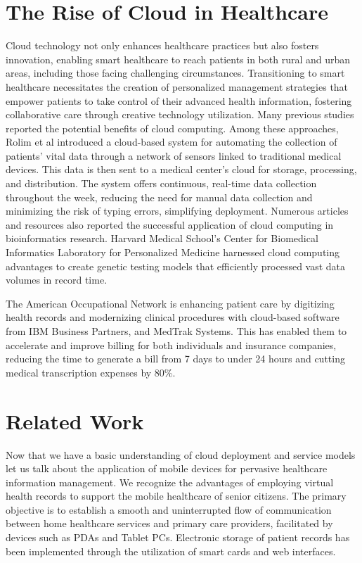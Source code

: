 \documentclass{article}
\begin{document}
\section{The Rise of Cloud in Healthcare} Cloud technology not only enhances healthcare practices but also fosters innovation, enabling smart healthcare to reach patients in both rural and urban areas, including those facing challenging circumstances.
Transitioning to smart healthcare necessitates the creation of personalized management strategies that empower patients to take control of their advanced health information, fostering collaborative care through creative technology utilization. Many previous studies reported the potential benefits of cloud computing.
Among these approaches, Rolim et al introduced a cloud-based system for automating the collection of patients' vital data through a network of sensors linked to traditional medical devices. This data is then sent to a medical center's cloud for storage, processing, and distribution. The system offers continuous, real-time data collection throughout the week, reducing the need for manual data collection and minimizing the risk of typing errors, simplifying deployment. Numerous articles and resources also reported the successful application of cloud computing in bioinformatics research. Harvard Medical School's Center for Biomedical Informatics Laboratory for Personalized Medicine harnessed cloud computing advantages to create genetic testing models that efficiently processed vast data volumes in record time.

The American Occupational Network is enhancing patient care by digitizing health records and modernizing clinical procedures with cloud-based software from IBM Business Partners, and MedTrak Systems. This has enabled them to accelerate and improve billing for both individuals and insurance companies, reducing the time to generate a bill from 7 days to under 24 hours and cutting medical transcription expenses by 80\%.


\section{Related Work}
Now that we have a basic understanding of cloud deployment and service models let us talk about the application of mobile devices for pervasive healthcare information management.
 We recognize the advantages of employing virtual health records to support the mobile healthcare of senior citizens. The primary objective is to establish a smooth and uninterrupted flow of communication between home healthcare services and primary care providers, facilitated by devices such as PDAs and Tablet PCs. Electronic storage of patient records has been implemented through the utilization of smart cards and web interfaces.
\end{document}

